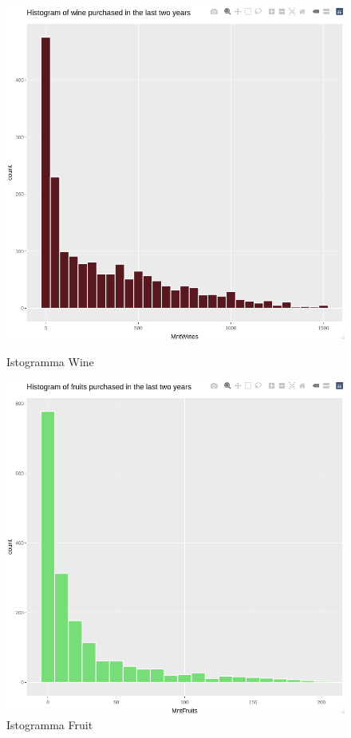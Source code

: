 \documentclass[letterpaper,11pt]{article}
\begin{document}
\begin{figure}[H]
  \centering
  \begin{minipage}[b]{0.4\textwidth}
    \includegraphics[width=\textwidth]{Img/EDA/EDA018.png}
    \caption{Istogramma Wine}
    \label{fig:IstogrammaWine}
  \end{minipage}
  \hfill
  \begin{minipage}[b]{0.4\textwidth}
    \includegraphics[width=\textwidth]{Img/EDA/EDA019.png}
    \caption{Istogramma Fruit}
     \label{fig:IstogrammaFruit}
  \end{minipage}
\end{figure}
\end{document}

